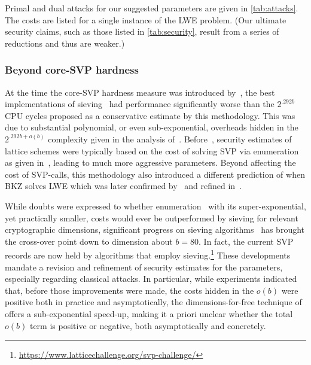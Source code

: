 Primal and dual attacks for our suggested parameters are given in
\autoref{tab:attacks}.  The costs are listed for a single instance of
the LWE problem. (Our ultimate security claims, such as those listed
in \autoref{tab:security}, result from a series of reductions and thus
are weaker.)




\subsubsection{Beyond core-SVP hardness}
\label{sec:beyond-core}

At the time the core-SVP hardness measure was introduced by~\cite{USENIX:ADPS16}, the best implementations of sieving~\cite{SODA:BDGL16,mariano2017parallel} had performance significantly worse than the $2^{.292b}$ CPU cycles proposed as a conservative estimate by this methodology. This was due to substantial polynomial, or even sub-exponential, overheads hidden in the $2^{.292b + o(b)}$ complexity given in the analysis of~\cite{SODA:BDGL16}. Before~\cite{USENIX:ADPS16}, security estimates of lattice schemes were typically based on the cost of solving SVP via enumeration as given in~\cite{AC:CheNgu11,albrecht15:_concrete_lwe}, leading to much more aggressive parameters. Beyond affecting the cost of SVP-calls, this methodology also introduced a different prediction of when BKZ solves LWE which was later confirmed by~\cite{AC:AGVW17} and refined in~\cite{dachman2020lwe}.

While doubts were expressed to whether enumeration~\cite{AC:CheNgu11} with its super-exponential, yet practically smaller, costs would ever be outperformed by sieving for relevant cryptographic dimensions, significant progress on sieving algorithms~\cite{ducas2018shortest,albrecht2019general} has brought the cross-over point down to dimension about $b = 80$. In fact, the current SVP records are now held by algorithms that employ sieving.\footnote{\url{https://www.latticechallenge.org/svp-challenge/}} These developments mandate a revision and refinement of security estimates for the \FrodoKEM parameters, especially regarding classical attacks. In particular, while experiments indicated that, before those improvements were made, the costs hidden in the $o(b)$ were positive both in practice and asymptotically, the dimensions-for-free technique of~\cite{ducas2018shortest} offers a sub-exponential speed-up, making it a priori unclear whether the total $o(b)$ term is positive or negative, both asymptotically and concretely.

